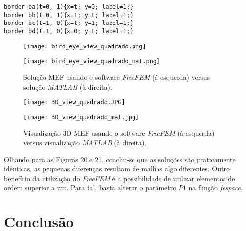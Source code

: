 \documentclass{article}
\theoremstyle{definition}
\theoremstyle{plain}
\numberwithin{equation}{section}
\newcommand{\tab}{\hspace{10mm}}
\begin{document}
\vspace{1mm}
\begin{lstlisting}[frame=single]
border ba(t=0, 1){x=t; y=0; label=1;}
border bb(t=0, 1){x=1; y=t; label=1;} 
border bc(t=1, 0){x=t; y=1; label=1;} 
border bd(t=1, 0){x=0; y=t; label=1;}
\end{lstlisting}

\vspace{1mm}
\begin{figure} [H]
\centering
\begin{minipage}{0.4\textwidth}
  \centering
  \texttt{[image: bird\_eye\_view\_quadrado.png]}
\end{minipage}%
\begin{minipage}{0.4\textwidth}
  \centering
  \vspace{1.5mm}
  \texttt{[image: bird\_eye\_view\_quadrado\_mat.png]}
\end{minipage}
\caption{Solução MEF usando o software \emph{FreeFEM} (à esquerda) versus solução \emph{MATLAB} (à direita).}
\end{figure}

\vspace{1mm}
\begin{figure} [H]
\centering
\begin{minipage}{0.4\textwidth}
  \centering
  \texttt{[image: 3D\_view\_quadrado.JPG]}
\end{minipage}%
\begin{minipage}{0.4\textwidth}
  \centering
  \vspace{1.5mm}
  \texttt{[image: 3D\_view\_quadrado\_mat.jpg]}
\end{minipage}
\caption{Visualização 3D MEF usando o software \emph{FreeFEM} (à esquerda) versus visualização \emph{MATLAB} (à direita).}
\end{figure}

\vspace{1mm}

\tab Olhando para as Figuras 20 e 21, conclui-se  que as soluções são praticamente idênticas, as pequenas diferenças resultam de malhas algo diferentes. Outro benefício da utilização do \emph{FreeFEM} é a possibilidade de utilizar elementos de ordem superior a um. Para tal, basta alterar o parâmetro $P1$ na função \emph{fespace}.

\section{Conclusão}
\end{document}
